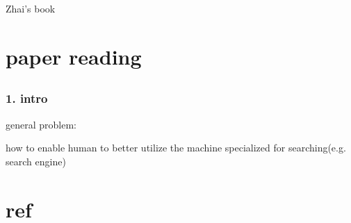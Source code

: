 \documentclass[•]{article}
\begin{document}
Zhai's book

\section{paper reading}
\subsection{\cite{White2007}}
\subsubsection{1. intro}
general problem:

how to enable human to better utilize the machine specialized for searching(e.g. search engine)



\section{ref}




\end{document}
